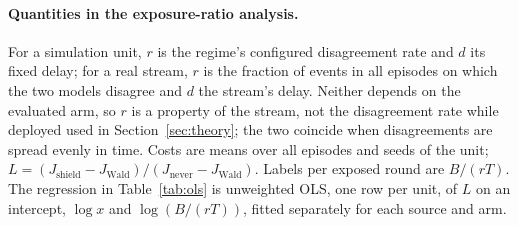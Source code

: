 \documentclass[10pt]{article}
\theoremstyle{plain}
\theoremstyle{definition}
\begin{document}
\paragraph{Quantities in the exposure-ratio analysis.} For a simulation unit, $r$ is the regime's configured disagreement rate and $d$ its fixed delay; for a real stream, $r$ is the fraction of events in all episodes on which the two models disagree and $d$ the stream's delay. Neither depends on the evaluated arm, so $r$ is a property of the stream, not the disagreement rate while deployed used in Section~\ref{sec:theory}; the two coincide when disagreements are spread evenly in time. Costs are means over all episodes and seeds of the unit; $L=(J_{\text{shield}}-J_{\text{Wald}})/(J_{\text{never}}-J_{\text{Wald}})$. Labels per exposed round are $B/(rT)$. The regression in Table~\ref{tab:ols} is unweighted OLS, one row per unit, of $L$ on an intercept, $\log x$ and $\log(B/(rT))$, fitted separately for each source and arm.
\begin{table}[!htbp]
\caption{Unweighted OLS of $L$ on an intercept, $\log x$ and $\log(B/(rT))$, the log labels available per expected disagreement; one row per analysis unit, fitted separately by source and arm.}
\label{tab:ols}\centering\small
\end{table}
\end{document}

